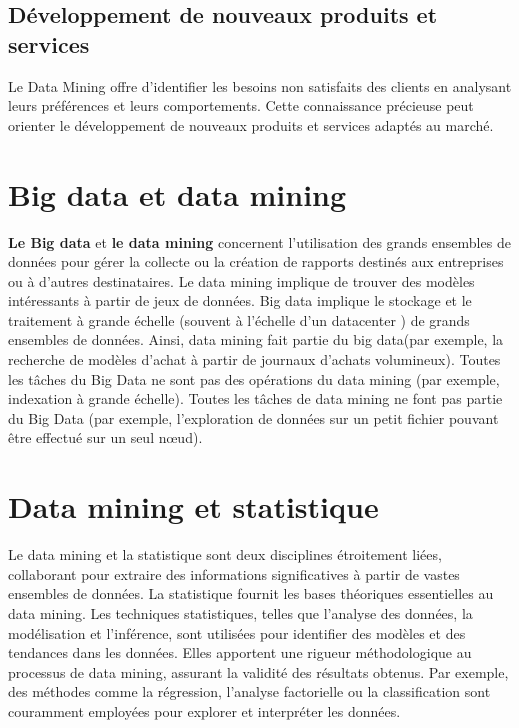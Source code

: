 \documentclass[a4paper,12pt]{report}
\begin{document}
        \subsection{Développement de nouveaux produits et services}
            Le Data Mining offre d’identifier les besoins non satisfaits des clients en analysant leurs préférences et leurs comportements. Cette connaissance précieuse peut orienter le développement de nouveaux produits et services adaptés au marché.


    \section{Big data et data mining} 
        \textbf{Le Big data} et \textbf{le data mining} concernent l’utilisation des grands ensembles de données pour gérer la collecte ou la création de rapports destinés aux entreprises ou à d’autres destinataires. Le data mining implique de trouver des modèles intéressants à partir de jeux de données. Big data implique le stockage et le traitement à grande échelle (souvent à l’échelle d’un datacenter ) de grands ensembles de données. Ainsi, data mining fait partie du big data(par exemple, la recherche de modèles d’achat à partir de journaux d’achats volumineux). Toutes les tâches du Big Data ne sont pas des opérations du data mining (par exemple, indexation à grande échelle). Toutes les tâches de data mining ne font pas partie du Big Data (par exemple, l’exploration de données sur un petit fichier pouvant être effectué sur un seul nœud).
        
        
    \section{Data mining et statistique} 
        ​Le data mining et la statistique sont deux disciplines étroitement liées, collaborant pour extraire des informations significatives à partir de vastes ensembles de données. 
        La statistique fournit les bases théoriques essentielles au data mining. Les techniques statistiques, telles que l'analyse des données, la modélisation et l'inférence, sont utilisées pour identifier des modèles et des tendances dans les données. Elles apportent une rigueur méthodologique au processus de data mining, assurant la validité des résultats obtenus. Par exemple, des méthodes comme la régression, l'analyse factorielle ou la classification sont couramment employées pour explorer et interpréter les données.
        
        
\end{document}
